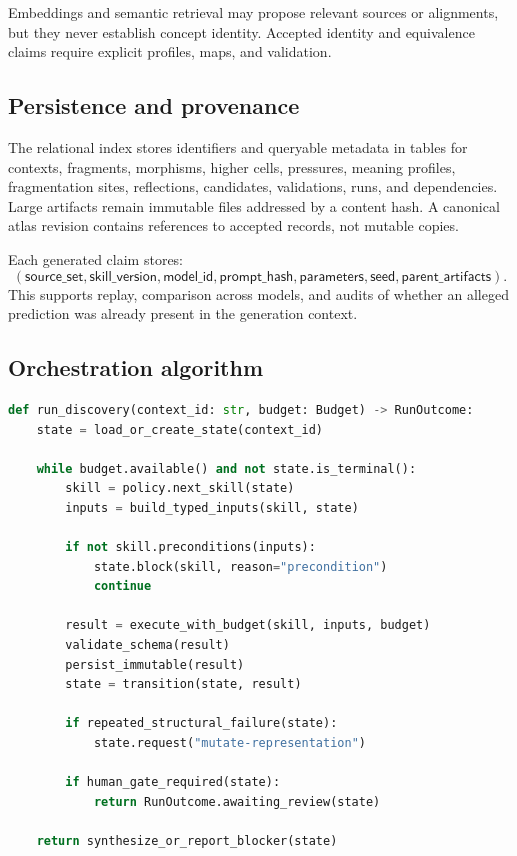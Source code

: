 \documentclass[11pt]{article}
\begin{document}
Embeddings and semantic retrieval may propose relevant sources or alignments, but they never establish
concept identity. Accepted identity and equivalence claims require explicit profiles, maps, and
validation.

\subsection{Persistence and provenance}

The relational index stores identifiers and queryable metadata in tables for contexts, fragments,
morphisms, higher cells, pressures, meaning profiles, fragmentation sites, reflections, candidates,
validations, runs, and dependencies. Large artifacts remain immutable files addressed by a content
hash. A canonical atlas revision contains references to accepted records, not mutable copies.

Each generated claim stores:
\begin{equation}
(\mathsf{source\_set},\mathsf{skill\_version},\mathsf{model\_id},
\mathsf{prompt\_hash},\mathsf{parameters},\mathsf{seed},
\mathsf{parent\_artifacts}).
\end{equation}
This supports replay, comparison across models, and audits of whether an alleged prediction was already
present in the generation context.

\subsection{Orchestration algorithm}

\begin{lstlisting}[style=spec,language=Python,caption={Simplified orchestration loop.}]
def run_discovery(context_id: str, budget: Budget) -> RunOutcome:
    state = load_or_create_state(context_id)

    while budget.available() and not state.is_terminal():
        skill = policy.next_skill(state)
        inputs = build_typed_inputs(skill, state)

        if not skill.preconditions(inputs):
            state.block(skill, reason="precondition")
            continue

        result = execute_with_budget(skill, inputs, budget)
        validate_schema(result)
        persist_immutable(result)
        state = transition(state, result)

        if repeated_structural_failure(state):
            state.request("mutate-representation")

        if human_gate_required(state):
            return RunOutcome.awaiting_review(state)

    return synthesize_or_report_blocker(state)
\end{lstlisting}
\end{document}
